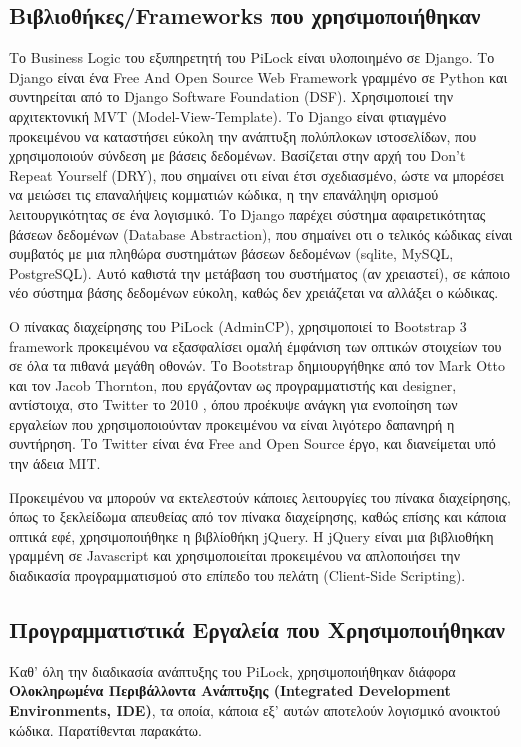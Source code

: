 	\subsection{Βιβλιοθήκες/Frameworks που χρησιμοποιήθηκαν}
		\label{sub:fws}
		Το Business Logic του εξυπηρετητή του PiLock είναι υλοποιημένο σε Django. Το Django είναι ένα Free And Open Source Web Framework γραμμένο σε Python και συντηρείται από το Django Software Foundation (DSF). Χρησιμοποιεί την αρχιτεκτονική MVT (Model-View-Template). Το Django είναι φτιαγμένο προκειμένου να καταστήσει εύκολη την ανάπτυξη πολύπλοκων ιστοσελίδων, που χρησιμοποιούν σύνδεση με βάσεις δεδομένων. Βασίζεται στην αρχή του Don't Repeat Yourself (DRY), που σημαίνει οτι είναι έτσι σχεδιασμένο, ώστε να μπορέσει να μειώσει τις επαναλήψεις κομματιών κώδικα, η την επανάληψη ορισμού λειτουργικότητας σε ένα λογισμικό. Το Django παρέχει σύστημα αφαιρετικότητας βάσεων δεδομένων (Database Abstraction), που σημαίνει οτι ο τελικός κώδικας είναι συμβατός με μια πληθώρα συστημάτων βάσεων δεδομένων (sqlite, MySQL, PostgreSQL). Αυτό καθιστά την μετάβαση του συστήματος (αν χρειαστεί), σε κάποιο νέο σύστημα βάσης δεδομένων εύκολη, καθώς δεν χρειάζεται να αλλάξει ο κώδικας.

		Ο πίνακας διαχείρησης του PiLock (AdminCP), χρησιμοποιεί το Bootstrap 3 framework προκειμένου να εξασφαλίσει ομαλή έμφάνιση των οπτικών στοιχείων του σε όλα τα πιθανά μεγάθη οθονών. Το Bootstrap δημιουργήθηκε από τον Mark Otto και τον Jacob Thornton, που εργάζονταν ως προγραμματιστής και designer, αντίστοιχα, στο Twitter το 2010 \textsuperscript{\cite{BS_about}}, όπου προέκυψε ανάγκη για ενοποίηση των εργαλείων που χρησιμοποιούνταν προκειμένου να είναι λιγότερο δαπανηρή η συντήρηση. Το Twitter είναι ένα Free and Open Source έργο, και διανείμεται υπό την άδεια MIT.
 		
 		Προκειμένου να μπορούν να εκτελεστούν κάποιες λειτουργίες του πίνακα διαχείρησης, όπως το ξεκλείδωμα απευθείας από τον πίνακα διαχείρησης, καθώς επίσης και κάποια οπτικά εφέ, χρησιμοποιήθηκε η βιβλίοθήκη jQuery. H jQuery είναι μια βιβλιοθήκη γραμμένη σε Javascript και χρησιμοποιείται προκειμένου να απλοποιήσει την διαδικασία προγραμματισμού στο επίπεδο του πελάτη (Client-Side Scripting).

 	\subsection{Προγραμματιστικά Εργαλεία που Χρησιμοποιήθηκαν}
 		Καθ' όλη την διαδικασία ανάπτυξης του PiLock, χρησιμοποιήθηκαν διάφορα \textbf{Ολοκληρωμένα Περιβάλλοντα Ανάπτυξης (Integrated Development Environments, IDE)}, τα οποία, κάποια εξ' αυτών αποτελούν λογισμικό ανοικτού κώδικα. Παρατίθενται παρακάτω.

